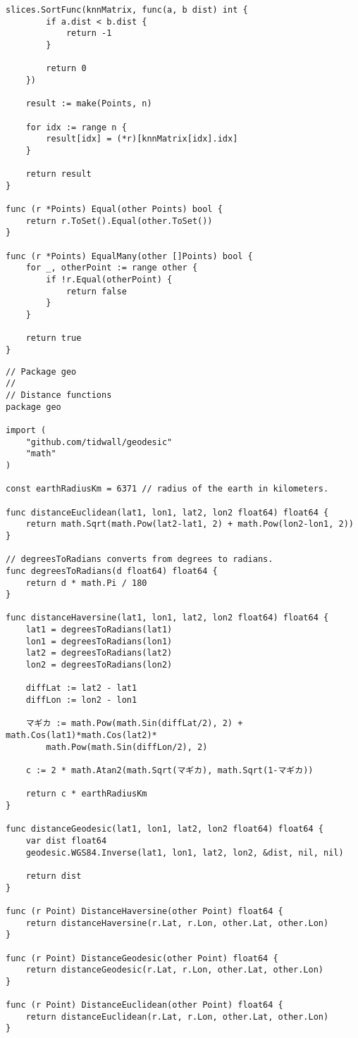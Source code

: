 \begin{lstlisting}[caption=points.go]
	slices.SortFunc(knnMatrix, func(a, b dist) int {
		if a.dist < b.dist {
			return -1
		}

		return 0
	})

	result := make(Points, n)

	for idx := range n {
		result[idx] = (*r)[knnMatrix[idx].idx]
	}

	return result
}

func (r *Points) Equal(other Points) bool {
	return r.ToSet().Equal(other.ToSet())
}

func (r *Points) EqualMany(other []Points) bool {
	for _, otherPoint := range other {
		if !r.Equal(otherPoint) {
			return false
		}
	}

	return true
}

\end{lstlisting}

\begin{lstlisting}[caption=distance.go]
// Package geo
//
// Distance functions
package geo

import (
	"github.com/tidwall/geodesic"
	"math"
)

const earthRadiusKm = 6371 // radius of the earth in kilometers.

func distanceEuclidean(lat1, lon1, lat2, lon2 float64) float64 {
	return math.Sqrt(math.Pow(lat2-lat1, 2) + math.Pow(lon2-lon1, 2))
}

// degreesToRadians converts from degrees to radians.
func degreesToRadians(d float64) float64 {
	return d * math.Pi / 180
}

func distanceHaversine(lat1, lon1, lat2, lon2 float64) float64 {
	lat1 = degreesToRadians(lat1)
	lon1 = degreesToRadians(lon1)
	lat2 = degreesToRadians(lat2)
	lon2 = degreesToRadians(lon2)

	diffLat := lat2 - lat1
	diffLon := lon2 - lon1

	マギカ := math.Pow(math.Sin(diffLat/2), 2) + math.Cos(lat1)*math.Cos(lat2)*
		math.Pow(math.Sin(diffLon/2), 2)

	c := 2 * math.Atan2(math.Sqrt(マギカ), math.Sqrt(1-マギカ))

	return c * earthRadiusKm
}

func distanceGeodesic(lat1, lon1, lat2, lon2 float64) float64 {
	var dist float64
	geodesic.WGS84.Inverse(lat1, lon1, lat2, lon2, &dist, nil, nil)

	return dist
}

func (r Point) DistanceHaversine(other Point) float64 {
	return distanceHaversine(r.Lat, r.Lon, other.Lat, other.Lon)
}

func (r Point) DistanceGeodesic(other Point) float64 {
	return distanceGeodesic(r.Lat, r.Lon, other.Lat, other.Lon)
}

func (r Point) DistanceEuclidean(other Point) float64 {
	return distanceEuclidean(r.Lat, r.Lon, other.Lat, other.Lon)
}

\end{lstlisting}

